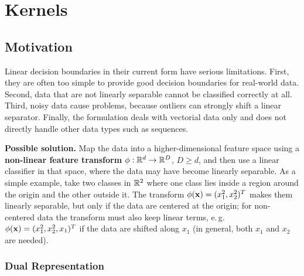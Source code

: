 
\section{Kernels}\autocite{schoelkopf2002,shawetaylor2004}

\subsection{Motivation}

	Linear decision boundaries in their current form have serious limitations. First, they are often too simple to provide good decision boundaries for real-world data. Second, data that are not linearly separable cannot be classified correctly at all. Third, noisy data cause problems, because outliers can strongly shift a linear separator. Finally, the formulation deals with vectorial data only and does not directly handle other data types such as sequences.

	\textbf{Possible solution.} Map the data into a higher-dimensional feature space using a \textbf{non-linear feature transform} $\phi:\mathbb{R}^d\rightarrow\mathbb{R}^D$, $D\ge d$, and then use a linear classifier in that space, where the data may have become linearly separable. As a simple example, take two classes in $\mathbb{R}^2$ where one class lies inside a region around the origin and the other outside it. The transform $\phi(\bm{\mathrm{x}})=(x_1^2, x_2^2)^T$ makes them linearly separable, but only if the data are centered at the origin; for non-centered data the transform must also keep linear terms, e.\,g.\ $\phi(\bm{\mathrm{x}})=(x_1^2, x_2^2, x_1)^T$ if the data are shifted along $x_1$ (in general, both $x_1$ and $x_2$ are needed).
     
  
	\subsubsection{Dual Representation}

